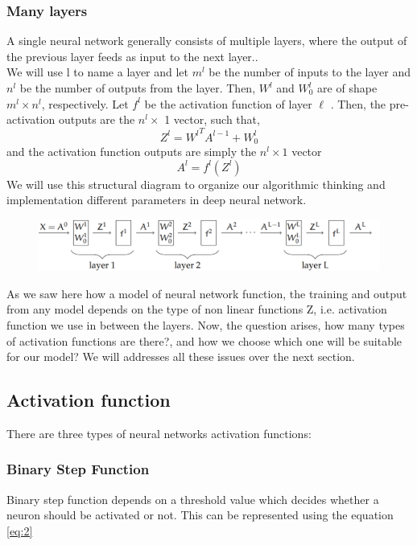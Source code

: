 \subsubsection{Many layers}

A single neural network generally consists of multiple layers, where the output of the previous layer feeds as input to the next layer..\\
 We will use l to name a layer and 
let $m^l$ be the  number of inputs to the layer and $n^l$ be the number of outputs from the layer. Then, $W^l$ and $W^l _0$ are of shape $m^l \times n^l$, respectively. Let $f^l$ be the activation
function of layer  $ \ell$ . Then, the pre-activation outputs are the $n^l \times$ 1 vector, such that,
\begin{equation*}
    Z^l = {W^l}^T A^{l-1} + W_0^l
\end{equation*}
and the activation function outputs are simply the $n^l \times 1$ vector
\begin{equation*}
    A^l = f^l(Z^l)
\end{equation*}
We will use this structural diagram to organize our algorithmic thinking and implementation different parameters in deep neural network.
\begin{figure}[H]
    \centering
    \includegraphics[scale=0.3]{Figure/ml__3.png}
    \label{fig:my_label}
\end{figure}

As we saw here how a model of neural network function, the training and output from any model depends on the type of non linear functions Z, i.e. activation function we use in between the layers. Now, the question arises, how many types of activation functions are there?, and how we choose which one will be suitable for our model? We will addresses all these issues over the next section.

\subsection{ Activation function}
\label{subsection:Activationfunction}
There are three types of neural networks activation functions\cite{https://doi.org/10.48550/arxiv.1811.03378}:
\subsubsection{Binary Step Function}
Binary step function depends on a threshold value which decides whether a neuron should be activated or not. This can be represented using the equation \autoref{eq:2}

